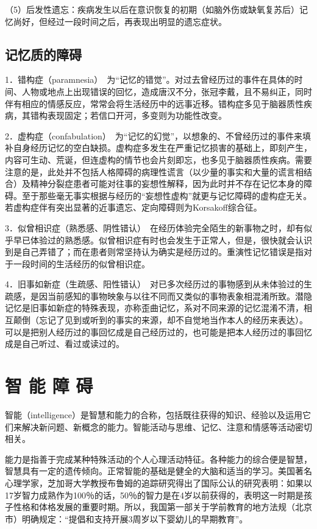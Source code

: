 （5）后发性遗忘：疾病发生以后在意识恢复的初期（如脑外伤或缺氧复苏后）记忆尚好，但经过一段时间之后，再表现出明显的遗忘症状。

\subsection{记忆质的障碍}

1．错构症（paramnesia）　为``记忆的错觉''。对过去曾经历过的事件在具体的时间、人物或地点上出现错误的回忆，造成唐汉不分，张冠李戴，且不易纠正，同时伴有相应的情感反应，常常会将生活经历中的远事近移。错构症多见于脑器质性疾病，其错构表现固定；若信口开河，多变则为功能性改变。

2．虚构症（confabulation）　为``记忆的幻觉''，以想象的、不曾经历过的事件来填补自身经历记忆的空白缺损。虚构症多发生在严重记忆损害的基础上，即刻产生，内容可生动、荒诞，但连虚构的情节也会片刻即忘，也多见于脑器质性疾病。需要注意的是，此处并不包括人格障碍的病理性谎言（以少量的事实和大量的谎言相结合）及精神分裂症患者可能对往事的妄想性解释，因为此时并不存在记忆本身的障碍。至于那些毫无事实根据与经历的``妄想性虚构''就更与记忆障碍的虚构症无关。若虚构症伴有突出显著的近事遗忘、定向障碍则为Korsakoff综合征。

3．似曾相识症（熟悉感、阴性错认）　在经历体验完全陌生的新事物之时，却有似乎早已体验过的熟悉感。似曾相识症有时也会发生于正常人，但是，很快就会认识到是自己弄错了；而在患者则常坚持认为确实是经历过的。重演性记忆错误是指对于一段时间的生活经历的似曾相识症。

4．旧事如新症（生疏感、阳性错认）　对已多次经历过的事物感到从未体验过的生疏感，是因当前感知的事物映象与以往不同而又类似的事物表象相混淆所致。潜隐记忆是旧事如新症的特殊表现，亦称歪曲记忆，系对不同来源的记忆混淆不清，相互颠倒（忘记了见到或听到的事实的来源，却不自觉地当作本人的经历来表达）。可以是把别人经历过的事回忆成是自己经历过的，也可能是把本人经历过的事回忆成是自己听过、看过或读过的。

\section{智 能 障 碍}

智能（intelligence）是智慧和能力的合称，包括既往获得的知识、经验以及运用它们来解决新问题、新概念的能力。智能活动与思维、记忆、注意和情感等活动密切相关。

能力是指善于完成某种特殊活动的个人心理活动特征。各种能力的综合便是智慧，智慧具有一定的遗传倾向。正常智能的基础是健全的大脑和适当的学习。美国著名心理学家，芝加哥大学教授布鲁姆的追踪研究得出了国际公认的研究表明：如果以17岁智力成熟作为100％的话，50％的智力是在4岁以前获得的，表明这一时期是孩子性格和体格发展的重要时期。所以，我国第一部关于学前教育的地方法规（北京市）明确规定：``提倡和支持开展3周岁以下婴幼儿的早期教育''。

